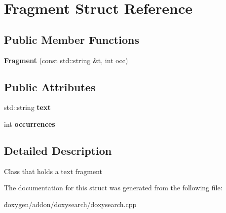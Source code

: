 \hypertarget{struct_fragment}{}\section{Fragment Struct Reference}
\label{struct_fragment}
\subsection*{Public Member Functions}
\begin{DoxyCompactItemize}
\item 
\mbox{\label{struct_fragment_a78586dce837f6960bb768dfcd56636eb}} 
{\bfseries Fragment} (const std\+::string \&t, int occ)
\end{DoxyCompactItemize}
\subsection*{Public Attributes}
\begin{DoxyCompactItemize}
\item 
\mbox{\label{struct_fragment_a2e023294ab0873fabbffbf82dcdc90b1}} 
std\+::string {\bfseries text}
\item 
\mbox{\label{struct_fragment_a4ddad010dfd5682bc7adf55142253441}} 
int {\bfseries occurrences}
\end{DoxyCompactItemize}


\subsection{Detailed Description}
Class that holds a text fragment 

The documentation for this struct was generated from the following file\+:\begin{DoxyCompactItemize}
\item 
doxygen/addon/doxysearch/doxysearch.\+cpp\end{DoxyCompactItemize}
